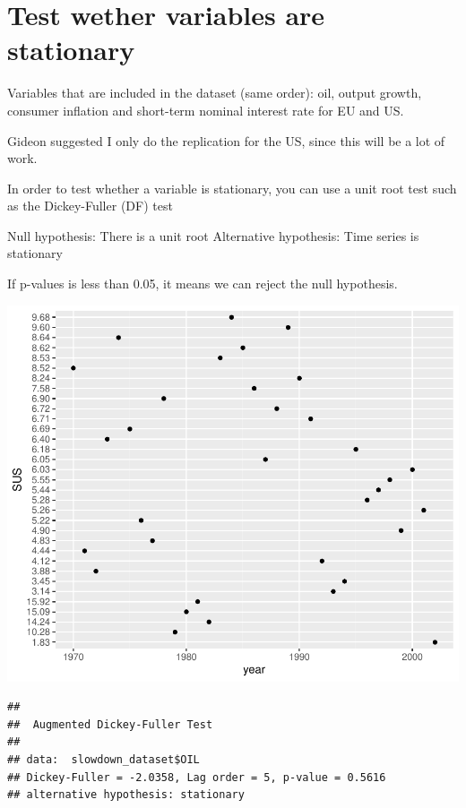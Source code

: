\documentclass[11pt,preprint, authoryear]{elsarticle}
\numberwithin{equation}{section}
\numberwithin{figure}{section}
\numberwithin{table}{section}
\begin{document}
\hypertarget{test-wether-variables-are-stationary}{%
\section{\texorpdfstring{Test wether variables are stationary
\label{stationary}}{Test wether variables are stationary }}\label{test-wether-variables-are-stationary}}

Variables that are included in the dataset (same order): oil, output
growth, consumer inflation and short-term nominal interest rate for EU
and US.

Gideon suggested I only do the replication for the US, since this will
be a lot of work.

In order to test whether a variable is stationary, you can use a unit
root test such as the Dickey-Fuller (DF) test

Null hypothesis: There is a unit root Alternative hypothesis: Time
series is stationary

If p-values is less than 0.05, it means we can reject the null
hypothesis.

\includegraphics{replication_files/figure-latex/unnamed-chunk-2-1.pdf}

\begin{verbatim}
## 
##  Augmented Dickey-Fuller Test
## 
## data:  slowdown_dataset$OIL
## Dickey-Fuller = -2.0358, Lag order = 5, p-value = 0.5616
## alternative hypothesis: stationary
\end{verbatim}
\end{document}

